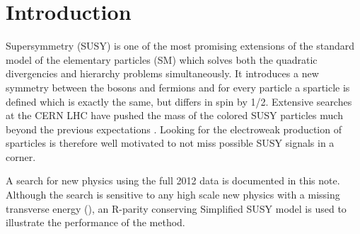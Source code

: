 \section{Introduction}
\label{sect:introduction}

Supersymmetry \cite{Martin:1997ns} (SUSY) is one of the most promising extensions of the 
standard model of the elementary particles (SM) which solves both the 
quadratic divergencies and hierarchy problems simultaneously. It introduces a new symmetry between the bosons and fermions and 
for every particle a sparticle is defined which is exactly the same, but differs in spin by 1/2. 
Extensive searches at the CERN LHC have pushed the mass of the colored SUSY particles much beyond the previous expectations \cite{susyPhyRes}. 
Looking for the electroweak production of sparticles is therefore well motivated to not miss possible SUSY signals in a corner. 


A search for new physics using the full 2012 data is documented in this note. 
Although the search is sensitive to any high scale 
new physics with a missing transverse energy (\MET), 
an R-parity conserving Simplified SUSY model \cite{Alwall:2008ag,alves:sms} is used 
to illustrate the performance of the method.

